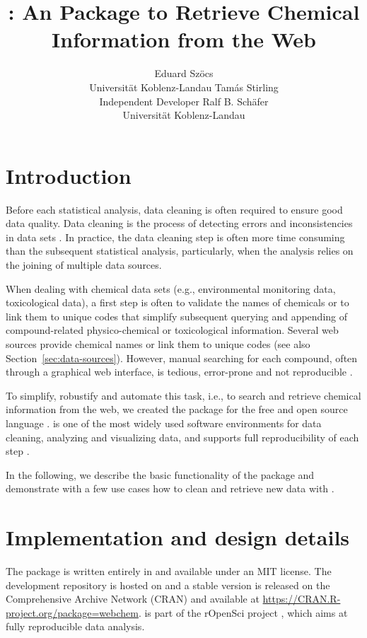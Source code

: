 \documentclass[article]{jss}
\author{Eduard Sz\"ocs\\Universit\"at Koblenz-Landau \And
	Tam\'as Stirling\\Independent Developer \And
        Ralf B. Sch\"afer\\Universit\"at Koblenz-Landau}
\title{\pkg{webchem}: An \proglang{R} Package to Retrieve Chemical Information from the Web}
\begin{document}
\section[Introduction]{Introduction}
Before each statistical analysis, data cleaning is often required to
ensure good data quality.  Data cleaning is the process of detecting
errors and inconsistencies in data sets \citep{Chapman_2005}.  In
practice, the data cleaning step is often more time consuming than the
subsequent statistical analysis, particularly, when the analysis
relies on the joining of multiple data sources.

When dealing with chemical data sets (e.g., environmental monitoring
data, toxicological data), a first step is often to validate the names
of chemicals or to link them to unique codes that simplify subsequent
querying and appending of compound-related physico-chemical or
toxicological information.  Several web sources provide chemical names
or link them to unique codes (see also
Section~\ref{sec:data-sources}).  However, manual searching for each
compound, often through a graphical web interface, is tedious,
error-prone and not reproducible \citep{Peng_2009}.

To simplify, robustify and automate this task, i.e., to search and
retrieve chemical information from the web, we created the
 package \citep{cran} for the free and open source
 language \citep{r_2015, Wehrens_2011}.   is
one of the most widely used software environments for data cleaning,
analyzing and visualizing data, and supports full reproducibility of
each step \citep{Marwick_2016}.

In the following, we describe the basic functionality of the package
and demonstrate with a few use cases how to clean and retrieve new
data with .


\section[Implementation and design details]{Implementation and design details}
The  package is written entirely in  and
available under an MIT license.  The development repository is hosted
on \citet{github} and a stable version is released on the
Comprehensive  Archive Network (CRAN) and available at
\url{https://CRAN.R-project.org/package=webchem}.   is
part of the rOpenSci project \citep{boettiger2015building}, which aims
at fully reproducible data analysis.
\end{document}
